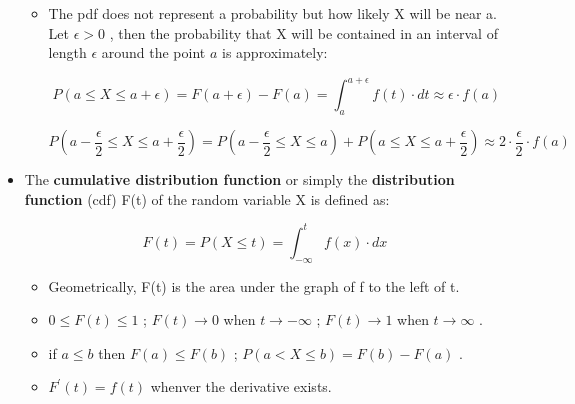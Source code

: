 \documentclass[12pt]{report}
\renewcommand{\_}{\kern-1.5pt\textunderscore\kern-1.5pt}
\begin{document}
\begin{itemize}
\begin{itemize}
	\item The pdf does not represent a probability but how likely X will be near a. Let  \(  \epsilon >0 \) , then the probability that X will be contained in an interval of length  \(  \epsilon  \)  around the point  \( a \)  is approximately:\par

 \[ P \left( a \leq X \leq a+ \epsilon  \right) =F \left( a+ \epsilon  \right) -F \left( a \right) = \int _{a}^{a+ \epsilon }f \left( t \right)  \cdot dt \approx  \epsilon  \cdot f \left( a \right)  \] \par

 \[ P \left( a-\frac{ \epsilon }{2} \leq X \leq a+\frac{ \epsilon }{2} \right) =P \left( a-\frac{ \epsilon }{2} \leq X \leq a \right) +P \left( a \leq X \leq a+\frac{ \epsilon }{2} \right)  \approx 2 \cdot \frac{ \epsilon }{2} \cdot f \left( a \right)  \] \par


\end{itemize}
	\item The \textbf{cumulative distribution function} or simply the \textbf{distribution function} (cdf) F(t) of the random variable X is defined as:\par

 \[ F \left( t \right) =P \left( X \leq t \right) = \int _{-\infty}^{t}f \left( x \right)  \cdot dx \] \par

\begin{itemize}
	\item Geometrically, F(t) is the area under the graph of f to the left of t. \par

	\item  \( 0 \leq F \left( t \right)  \leq 1 \) ;  \( F \left( t \right)  \rightarrow 0 \)  when  \( t \rightarrow -\infty \) ;  \( F \left( t \right)  \rightarrow 1 \)  when  \( t \rightarrow \infty \) .\par

	\item if  \( a \leq b \)  then  \( F \left( a \right)  \leq F \left( b \right)  \) ;  \( P \left( a<X \leq b \right) =F \left( b \right) -F \left( a \right)  \) .\par

	\item  \( F^{'} \left( t \right) =f \left( t \right)  \)  whenver the derivative exists.
\end{itemize}\par


\end{itemize}
\end{document}
